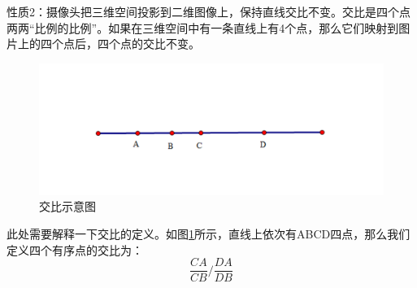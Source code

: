 性质2：摄像头把三维空间投影到二维图像上，保持直线交比不变。交比是四个点两两“比例的比例”。如果在三维空间中有一条直线上有4个点，那么它们映射到图片上的四个点后，四个点的交比不变。


\begin{figure}[H]
    \centering
    \includegraphics[scale=0.5]{figures/交比示意.png}
    \caption{交比示意图}
    \label{fig:p7}
\end{figure}
此处需要解释一下交比的定义。如图\ref{fig:p7}所示，直线上依次有ABCD四点，那么我们定义四个有序点的交比为：
\begin{equation}
    \frac{CA}{CB}/\frac{DA}{DB}
\end{equation}

